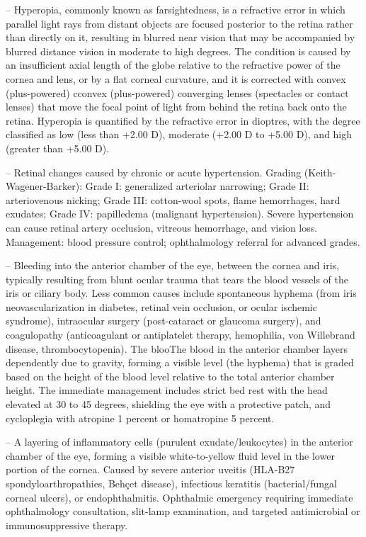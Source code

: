 -- Hyperopia, commonly known as farsightedness, is a refractive error in which parallel light rays from distant objects are focused posterior to the retina rather than directly on it, resulting in blurred near vision that may be accompanied by blurred distance vision in moderate to high degrees. The condition is caused by an insufficient axial length of the globe relative to the refractive power of the cornea and lens, or by a flat corneal curvature, and it is corrected with convex (plus-powered) cconvex (plus-powered) converging lenses (spectacles or contact lenses) that move the focal point of light from behind the retina back onto the retina. Hyperopia is quantified by the refractive error in dioptres, with the degree classified as low (less than +2.00 D), moderate (+2.00 D to +5.00 D), and high (greater than +5.00 D).

-- Retinal changes caused by chronic or acute hypertension. Grading (Keith-Wagener-Barker): Grade I: generalized arteriolar narrowing; Grade II: arteriovenous nicking; Grade III: cotton-wool spots, flame hemorrhages, hard exudates; Grade IV: papilledema (malignant hypertension). Severe hypertension can cause retinal artery occlusion, vitreous hemorrhage, and vision loss. Management: blood pressure control; ophthalmology referral for advanced grades.

-- Bleeding into the anterior chamber of the eye, between the cornea and iris, typically resulting from blunt ocular trauma that tears the blood vessels of the iris or ciliary body. Less common causes include spontaneous hyphema (from iris neovascularization in diabetes, retinal vein occlusion, or ocular ischemic syndrome), intraocular surgery (post-cataract or glaucoma surgery), and coagulopathy (anticoagulant or antiplatelet therapy, hemophilia, von Willebrand disease, thrombocytopenia). The blooThe blood in the anterior chamber layers dependently due to gravity, forming a visible level (the hyphema) that is graded based on the height of the blood level relative to the total anterior chamber height. The immediate management includes strict bed rest with the head elevated at 30 to 45 degrees, shielding the eye with a protective patch, and cycloplegia with atropine 1 percent or homatropine 5 percent.

-- A layering of inflammatory cells (purulent exudate/leukocytes) in the anterior chamber of the eye, forming a visible white-to-yellow fluid level in the lower portion of the cornea. Caused by severe anterior uveitis (HLA-B27 spondyloarthropathies, Behçet disease), infectious keratitis (bacterial/fungal corneal ulcers), or endophthalmitis. Ophthalmic emergency requiring immediate ophthalmology consultation, slit-lamp examination, and targeted antimicrobial or immunosuppressive therapy.

